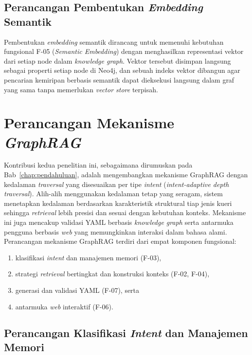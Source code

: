 \subsection{Perancangan Pembentukan \textit{Embedding} Semantik}
\label{subsec:vektorisasi-semantik}

Pembentukan \textit{embedding} semantik dirancang untuk memenuhi kebutuhan fungsional F-05
(\textit{Semantic Embedding}) dengan menghasilkan representasi vektor dari setiap node
dalam \textit{knowledge graph}. Vektor tersebut disimpan langsung sebagai properti setiap node di Neo4j, dan
sebuah indeks vektor dibangun agar pencarian kemiripan berbasis semantik dapat dieksekusi langsung dalam
graf yang sama tanpa memerlukan \textit{vector store} terpisah.

\section{Perancangan Mekanisme \textit{GraphRAG}}
\label{sec:perancangan-graphrag}

Kontribusi kedua penelitian ini, sebagaimana dirumuskan pada Bab~\ref{chap:pendahuluan},
adalah mengembangkan mekanisme GraphRAG dengan kedalaman \textit{traversal} yang disesuaikan
per tipe \textit{intent} (\textit{intent-adaptive depth traversal}).
Alih-alih menggunakan kedalaman tetap yang seragam, sistem menetapkan kedalaman berdasarkan
karakteristik struktural tiap jenis kueri sehingga \textit{retrieval} lebih presisi dan sesuai
dengan kebutuhan konteks.
Mekanisme ini juga mencakup validasi YAML berbasis \textit{knowledge graph}
serta antarmuka pengguna berbasis \textit{web} yang memungkinkan interaksi dalam bahasa alami.
Perancangan mekanisme GraphRAG terdiri dari empat komponen fungsional:
\begin{enumerate}
    \item klasifikasi \textit{intent} dan manajemen memori (F-03),
    \item strategi \textit{retrieval} bertingkat dan konstruksi konteks (F-02, F-04),
    \item generasi dan validasi YAML (F-07), serta
    \item antarmuka \textit{web} interaktif (F-06).
\end{enumerate}

\subsection{Perancangan Klasifikasi \textit{Intent} dan Manajemen Memori}
\label{subsec:klasifikasi-intent}

